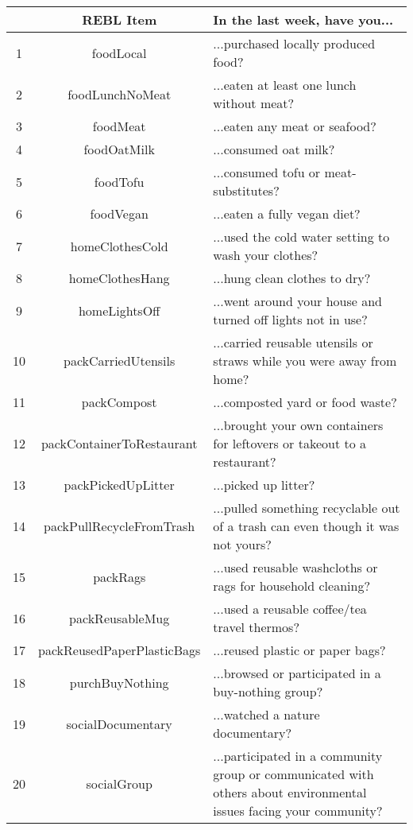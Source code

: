 \begin{table}[ht]
\centering
\begingroup\footnotesize
\begin{tabular}{ccp{7cm}}
  \hline
 & REBL Item & In the last week, have you... \\ 
  \hline
1 & foodLocal & ...purchased locally produced food? \\ 
  2 & foodLunchNoMeat & ...eaten at least one lunch without meat? \\ 
  3 & foodMeat & ...eaten any meat or seafood? \\ 
  4 & foodOatMilk & ...consumed oat milk? \\ 
  5 & foodTofu & ...consumed tofu or meat-substitutes? \\ 
  6 & foodVegan & ...eaten a fully vegan diet? \\ 
  7 & homeClothesCold & ...used the cold water setting to wash your clothes? \\ 
  8 & homeClothesHang & ...hung clean clothes to dry? \\ 
  9 & homeLightsOff & ...went around your house and turned off lights not in use? \\ 
  10 & packCarriedUtensils & ...carried reusable utensils or straws while you were away from home? \\ 
  11 & packCompost & ...composted yard or food waste? \\ 
  12 & packContainerToRestaurant & ...brought your own containers for leftovers or takeout to a restaurant? \\ 
  13 & packPickedUpLitter & ...picked up litter? \\ 
  14 & packPullRecycleFromTrash & ...pulled something recyclable out of a trash can even though it was not yours? \\ 
  15 & packRags & ...used reusable washcloths or rags for household cleaning? \\ 
  16 & packReusableMug & ...used a reusable coffee/tea travel thermos? \\ 
  17 & packReusedPaperPlasticBags & ...reused plastic or paper bags? \\ 
  18 & purchBuyNothing & ...browsed or participated in a buy-nothing group? \\ 
  19 & socialDocumentary & ...watched a nature documentary? \\ 
  20 & socialGroup & ...participated in a community group or communicated with others about environmental issues facing your community? \\ 

\end{tabular}
\end{table}
